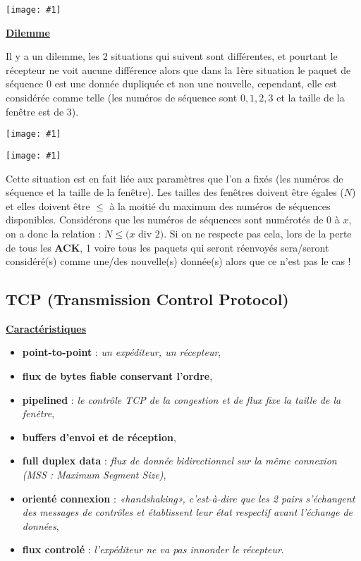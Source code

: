 \documentclass{article}
\newcommand{\imgR}[2]{\begin{center}\texttt{[image: \#1]}\end{center}}
\begin{document}
\imgR{CN_043.png}{400}
\newpage
\underline{\textbf{Dilemme}}

Il y a un dilemme, les 2 situations qui suivent sont différentes, et pourtant le récepteur ne voit aucune 
différence alors que dans la 1ère situation le paquet de séquence 0 est une donnée dupliquée et non une nouvelle, 
cependant, elle est considérée comme telle (les numéros de séquence sont $0,1,2,3$ et la taille de la fenêtre est 
de $3$).

\imgR{CN_187.png}{400}
\imgR{CN_188.png}{400}

Cette situation est en fait liée aux paramètres que l'on a fixés (les numéros de séquence et la taille de la 
fenêtre). Les tailles des fenêtres doivent être égales ($N$) et elles doivent être $\leq$ à la moitié du maximum 
des numéros de séquences disponibles. Considérons que les numéros de séquences sont numérotés de $0$ à 
$x$, on a donc la relation : $N\leq (x$ div $2)$. Si on ne respecte pas cela, lors de la perte de tous les 
\textbf{ACK}, 1 voire tous les paquets qui seront réenvoyés sera/seront considéré(s) comme une/des nouvelle(s) 
donnée(s) alors que ce n'est pas le cas !

\subsection{TCP (Transmission Control Protocol)}

\underline{\textbf{Caractéristiques}} \\
\begin{itemize}
\item \textbf{point-to-point} : \textit{un expéditeur, un récepteur},
\item \textbf{flux de bytes fiable conservant l'ordre},
\item \textbf{pipelined} : \textit{le contrôle TCP de la congestion et de flux fixe la taille de la fenêtre},
\item \textbf{buffers d'envoi et de réception},
\item \textbf{full duplex data} : \textit{flux de donnée bidirectionnel sur la même connexion \\
(MSS : Maximum Segment Size)},
\item \textbf{orienté connexion} : \textit{«handshaking», c'est-à-dire que les 2 pairs s'échangent des messages
de contrôles et établissent leur état respectif avant l'échange de données},
\item \textbf{flux controlé} : \textit{l'expéditeur ne va pas innonder le récepteur}. \\
\end{itemize}
\end{document}
